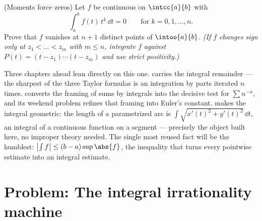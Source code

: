\begin{exercise}[$\star\star\star$]\label{exo:b1:integration:12}
(Moments force zeros) Let $f$ be continuous on $\intcc{a}{b}$
with
\[
\int_a^b f(t)\,t^k\,\dd t = 0 \qquad \text{for } k = 0, 1,
\dots, n .
\]
Prove that $f$ vanishes at $n + 1$ distinct points of
$\intoo{a}{b}$. \emph{(If $f$ changes sign only at $z_1 < \dots
< z_m$ with $m \leq n$, integrate $f$ against $P(t) = (t - z_1)
\cdots (t - z_m)$ and use strict positivity.)}
\end{exercise}

\begin{remark}
Three chapters ahead lean directly on this one.
 carries the integral remainder --- the
sharpest of the three Taylor formulas is an integration by parts
iterated $n$ times.  converts the framing of
sums by integrals into the decisive test for $\sum n^{-\alpha}$,
and its weekend problem refines that framing into Euler's
constant.  makes the integral geometric: the
length of a parametrized arc is $\int \sqrt{x'(t)^2 +
y'(t)^2}\,\dd t$, an integral of a continuous function on a
segment --- precisely the object built here, no improper theory
needed. The single most reused fact will be the humblest:
$\bigl|\int f\bigr| \leq (b - a)\sup\abs{f}$, the inequality
that turns every pointwise estimate into an integral estimate.
\end{remark}

\section{Problem: The integral irrationality machine}

